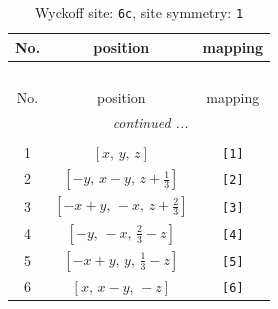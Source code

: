\documentclass[fleqn,8pt]{jsarticle}
\begin{document}
\renewcommand{\arraystretch}{1.2}
\begin{longtable}{ccc}
\caption{Wyckoff site: {\tt 6c}, site symmetry: {\tt 1}}
 \\
 \hline \hline
No. & position & mapping \\ \hline \endfirsthead

\multicolumn{2}{l}{\tablename\ \thetable{}} \\
 \hline \hline
No. & position & mapping \\ \hline \endhead

 \hline \hline
\multicolumn{2}{r}{\footnotesize\it continued ...} \\ \endfoot

 \hline \hline
\multicolumn{2}{r}{} \\ \endlastfoot

1 & $\left[ x,\, y,\, z \right]$ & {\tt [1]} \\ \hline
2 & $\left[ - y,\, x - y,\, z + \frac{1}{3} \right]$ & {\tt [2]} \\ \hline
3 & $\left[ - x + y,\, - x,\, z + \frac{2}{3} \right]$ & {\tt [3]} \\ \hline
4 & $\left[ - y,\, - x,\, \frac{2}{3} - z \right]$ & {\tt [4]} \\ \hline
5 & $\left[ - x + y,\, y,\, \frac{1}{3} - z \right]$ & {\tt [5]} \\ \hline
6 & $\left[ x,\, x - y,\, - z \right]$ & {\tt [6]} \\
\end{longtable}
\end{document}
